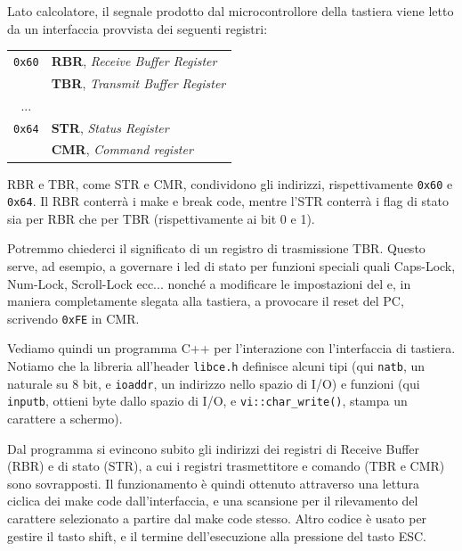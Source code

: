 \documentclass[a4paper,11pt]{article}
\begin{document}
Lato calcolatore, il segnale prodotto dal microcontrollore della tastiera viene letto da un interfaccia provvista dei seguenti registri:
\begin{table}[H]
	\center 
	\begin{tabular} { c | p{7cm} }
		\lstinline|0x60| & \textbf{RBR}, \textit{Receive Buffer Register} \\ 
		& \textbf{TBR}, \textit{Transmit Buffer Register} \\ 
		\hline
		... & \\
		\hline
		\lstinline|0x64| & \textbf{STR}, \textit{Status Register} \\
		& \textbf{CMR}, \textit{Command register}
	\end{tabular}
\end{table}

\begin{itemize}
\end{itemize}

RBR e TBR, come STR e CMR, condividono gli indirizzi, rispettivamente \lstinline|0x60| e \lstinline|0x64|.
Il RBR conterrà i make e break code, mentre l'STR conterrà i flag di stato sia per RBR che per TBR (rispettivamente ai bit 0 e 1).

Potremmo chiederci il significato di un registro di trasmissione TBR.
Questo serve, ad esempio, a governare i led di stato per funzioni speciali quali Caps-Lock, Num-Lock, Scroll-Lock ecc... nonché a modificare le impostazioni del  e, in maniera completamente slegata alla tastiera, a provocare il reset del PC, scrivendo \lstinline|0xFE| in CMR.

Vediamo quindi un programma C++ per l'interazione con l'interfaccia di tastiera.
Notiamo che la libreria all'header \lstinline|libce.h| definisce alcuni tipi (qui \lstinline|natb|, un naturale su 8 bit, e \lstinline|ioaddr|, un indirizzo nello spazio di I/O) e funzioni (qui \lstinline|inputb|, ottieni byte dallo spazio di I/O, e \lstinline|vi::char_write()|, stampa un carattere a schermo).

\lstset{language=C++}


Dal programma si evincono subito gli indirizzi dei registri di Receive Buffer (RBR) e di stato (STR), a cui i registri trasmettitore e comando (TBR e CMR) sono sovrapposti.
Il funzionamento è quindi ottenuto attraverso una lettura ciclica dei make code dall'interfaccia, e una scansione per il rilevamento del carattere selezionato a partire dal make code stesso.
Altro codice è usato per gestire il tasto shift, e il termine dell'esecuzione alla pressione del tasto ESC.
\end{document}
